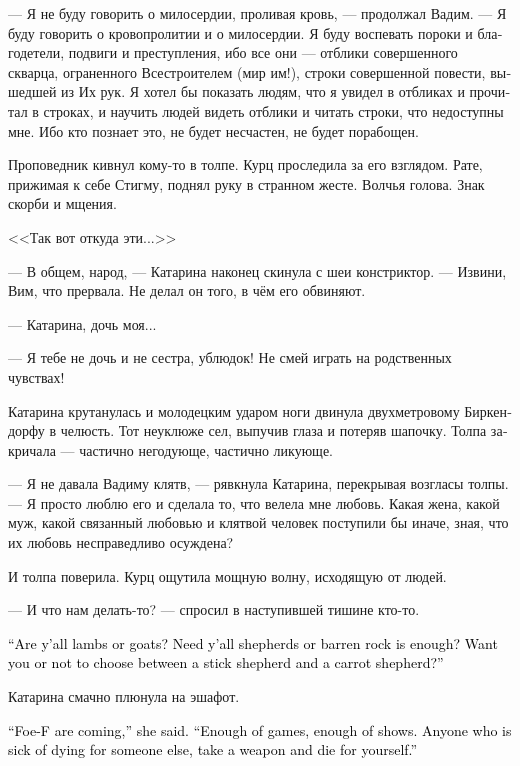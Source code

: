 \documentclass[a4paper,12pt,fleqn]{book}\usepackage{cooltooltips}\usepackage{polyglossia}\setdefaultlanguage[babelshorthands=true]{russian}\setotherlanguage{english}\defaultfontfeatures{Ligatures=TeX,Mapping=tex-text} \usepackage{xcolor}\definecolor{lightgray}{HTML}{bbbbbb}\color{lightgray}\newcommand{\ml}[3]{\textenglish{\textcolor{black}{#3}}}
\begin{document}
--- Я не буду говорить о милосердии, проливая кровь, --- продолжал Вадим.
--- Я буду говорить о кровопролитии и о милосердии.
Я буду воспевать пороки и благодетели, подвиги и преступления, ибо все они --- отблики совершенного скварца, ограненного Всестроителем (мир им!), строки совершенной повести, вышедшей из Их рук.
Я хотел бы показать людям, что я увидел в отбликах и прочитал в строках, и научить людей видеть отблики и читать строки, что недоступны мне.
Ибо кто познает это, не будет несчастен, не будет порабощен.

Проповедник кивнул кому-то в толпе.
Курц проследила за его взглядом.
Рате, прижимая к себе Стигму, поднял руку в странном жесте.
Волчья голова.
Знак скорби и мщения.

<<Так вот откуда эти...>>

--- В общем, народ, --- Катарина наконец скинула с шеи констриктор.
--- Извини, Вим, что прервала.
Не делал он того, в чём его обвиняют.

--- Катарина, дочь моя...

--- Я тебе не дочь и не сестра, ублюдок!
Не смей играть на родственных чувствах!

Катарина крутанулась и молодецким ударом ноги двинула двухметровому Биркендорфу в челюсть.
Тот неуклюже сел, выпучив глаза и потеряв шапочку.
Толпа закричала --- частично негодующе, частично ликующе.

--- Я не давала Вадиму клятв, --- рявкнула Катарина, перекрывая возгласы толпы.
--- Я просто люблю его и сделала то, что велела мне любовь.
Какая жена, какой муж, какой связанный любовью и клятвой человек поступили бы иначе, зная, что их любовь несправедливо осуждена?

И толпа поверила.
Курц ощутила мощную волну, исходящую от людей.

--- И что нам делать-то? --- спросил в наступившей тишине кто-то.

\ml{$0$}
{--- Овцы вы или козы?}
{``Are y'all lambs or goats?}
\ml{$0$}
{Нужен вам пастырь или достаточно бесплодной скалы?}
{Need y'all shepherds or barren rock is enough?}
\ml{$0$}
{Хотите ли вы выбирать между пастырем с кнутом и пастырем с морковкой?}
{Want you or not to choose between a stick shepherd and a carrot shepherd?''}

Катарина смачно плюнула на эшафот.

\ml{$0$}
{--- Фоу-Ф уже на подходах, --- сказала она.}
{``Foe-F are coming,'' she said.}
\ml{$0$}
{--- Хватит игр, хватит зрелищ.}
{``Enough of games, enough of shows.}
\ml{$0$}
{Кто не хочет умирать за чужие интересы, берите оружие и умрите за свои.}
{Anyone who is sick of dying for someone else, take a weapon and die for yourself.''}
\end{document}
